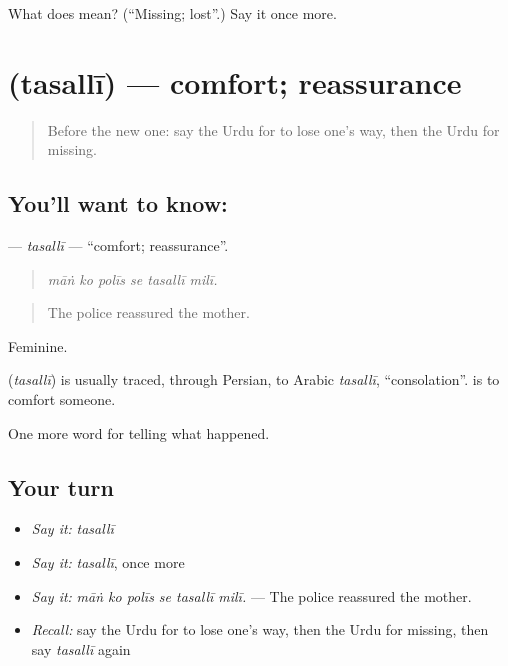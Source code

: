 \begin{tcolorbox}[breakable,colback=teal!4,colframe=teal!35!black,title={Before you move on}]
What does  mean? (\textquotedblleft{}Missing; lost\textquotedblright{}.) Say it once more.
\end{tcolorbox}
\section[\texorpdfstring{\ur{تسلی} (tasallī)}{تسلی (tasallī)}]{ (tasallī) — comfort; reassurance}

\label{lesson:UR-C298-tasalli}



\begin{quote}
Before the new one: say the Urdu for to lose one's way, then the Urdu for missing.
\end{quote}

\subsection*{You'll want to know: }
\textbf{} — \emph{tasallī} — \textquotedblleft{}comfort; reassurance\textquotedblright{}.

\begin{quote}
     
\end{quote}

\begin{quote}
\emph{māṅ ko polīs se tasallī milī.}
\end{quote}

\begin{quote}
The police reassured the mother.
\end{quote}

Feminine.

\begin{cousinweb}
\textbf{} (\emph{tasallī}) is usually traced, through Persian, to Arabic \emph{tasallī}, \textquotedblleft{}consolation\textquotedblright{}. \textbf{ } is to comfort someone.
\end{cousinweb}

\begin{grammarlens}[title={What you've built}]
One more word for telling what happened.
\end{grammarlens}

\subsection*{Your turn}
\begin{itemize}
\raggedright
  \item \emph{Say it:} \emph{tasallī}
  \item \emph{Say it:} \emph{tasallī}, once more
  \item \emph{Say it:} \emph{māṅ ko polīs se tasallī milī.} — The police reassured the mother.
  \item \emph{Recall:} say the Urdu for to lose one's way, then the Urdu for missing, then say \emph{tasallī} again
\end{itemize}

